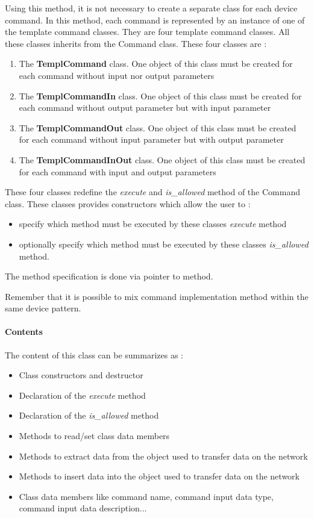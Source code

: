 Using this method, it is not necessary to create a separate class
for each device command. In this method, each command is represented
by an instance of one of the template command classes.
They are four template command classes. All these classes inherits
from the Command class. These four classes are :
\begin{enumerate}
\item The \textbf{TemplCommand} class. One object of
this class must be created for each command without input nor output
parameters
\item The \textbf{TemplCommandIn} class. One object
of this class must be created for each command without output parameter
but with input parameter
\item The \textbf{TemplCommandOut} class. One object
of this class must be created for each command without input parameter
but with output parameter
\item The \textbf{TemplCommandInOut} class. One
object of this class must be created for each command with input and
output parameters
\end{enumerate}
These four classes redefine the \emph{execute} and
\emph{is\_allowed} method of the Command class.
These classes provides constructors which allow the user to :
\begin{itemize}
\item specify which method must be executed by these classes \emph{execute}
method
\item optionally specify which method must be executed by these classes
\emph{is\_allowed} method.
\end{itemize}
The method specification is done via pointer to method.

Remember that it is possible to mix command implementation method
within the same device pattern.


\paragraph{Contents}

The content of this class can be summarizes as :
\begin{itemize}
\item Class constructors and destructor
\item Declaration of the \emph{execute} method
\item Declaration of the \emph{is\_allowed} method
\item Methods to read/set class data members
\item Methods to extract data from the object used to transfer
data on the network
\item Methods to insert data into the object used to transfer
data on the network
\item Class data members like command name, command input data type, command
input data description...
\end{itemize}

